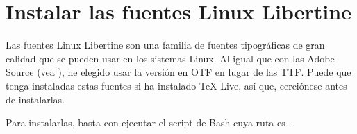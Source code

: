 \section{Instalar las fuentes Linux Libertine}\label{sec:lin-libertine}
Las fuentes Linux Libertine son una familia de fuentes tipográficas de gran calidad que se pueden usar en los
sistemas Linux. Al igual que con las Adobe Source (vea ), he elegido usar la versión
en OTF en lugar de las TTF. Puede que tenga instaladas estas fuentes si ha instalado \TeX{} Live, así que,
cerciónese antes de instalarlas.

Para instalarlas, basta con ejecutar el script de Bash cuya ruta es
.%
